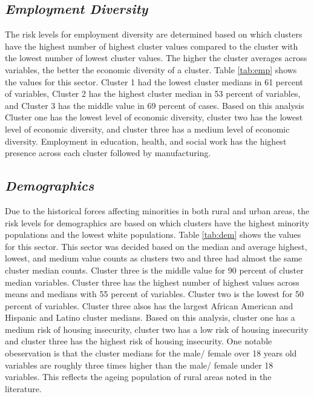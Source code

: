 \subsection{\textit{Employment Diversity}}
The risk levels for employment diversity are determined based on which clusters have the highest number of highest cluster values compared to the cluster with the lowest number of lowest cluster values. The higher the cluster averages across variables, the better the economic diversity of a cluster. Table \ref{tab:emp} shows the values for this sector. 
Cluster 1 had the lowest cluster medians in 61 percent of variables, 
Cluster 2 has the highest cluster median in 53 percent of variables, and Cluster 3 has the middle value in 69 %
percent of cases. Based on this analysis Cluster one has the lowest level of economic diversity, cluster two has the lowest level of economic diversity, and cluster three has a medium level of economic diversity. Employment in education, health, and social work has the highest presence across each cluster followed by manufacturing. 



\pagebreak

\subsection{\textit{Demographics}}

Due to the historical forces affecting minorities in both rural and urban areas, the risk levels for demographics are based on which clusters have the highest minority populations and the lowest white populations. 
Table \ref{tab:dem} shows the values for this sector.  This sector was decided based on the median and average highest, lowest, and medium value counts as clusters two and three had almost the same cluster median counts. Cluster three is the middle value for 90 percent of cluster median variables. Cluster three has the highest number of highest values across means and medians with 55 percent of variables. Cluster two is the lowest for 50 percent of variables. Cluster three alsos has the largest African American and Hispanic and Latino cluster medians. Based on this analysis, cluster one has a medium risk of housing insecurity, cluster two has a low risk of housing insecurity and cluster three has the highest risk of housing insecurity. One notable obeservation is that the cluster medians for the male/ female over 18 years old variables are roughly three times higher than the male/ female under 18 variables. This reflects the ageing population of rural areas noted in the literature. 

